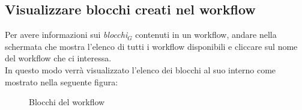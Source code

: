 \subsection{Visualizzare blocchi creati nel workflow}
Per avere informazioni sui \textit{blocchi$_{G}$} contenuti in un workflow, andare nella schermata che mostra l'elenco di tutti i workflow disponibili  e cliccare sul nome del workflow che ci interessa. \\
In questo modo verrà visualizzato l'elenco dei blocchi al suo interno come mostrato nella seguente figura: \\
\begin{figure}[!ht]
	\centering
	\caption{Blocchi del workflow}
\end{figure}
\newpage

